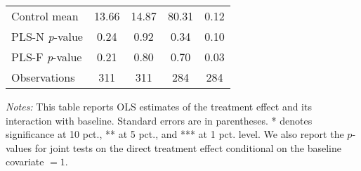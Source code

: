 \begin{table}[ht]
{\begin{threeparttable}
\begin{tabular}{l*{4}{c}}
Control mean    &    13.66         &    14.87         &    80.31         &     0.12         \\
PLS-N \emph{p}-value&     0.24         &     0.92         &     0.34         &     0.10         \\
PLS-F \emph{p}-value&     0.21         &     0.80         &     0.70         &     0.03         \\
Observations    &      311         &      311         &      284         &      284         \\
\bottomrule \end{tabular} \begin{tablenotes}[flushleft] \footnotesize \item \emph{Notes:} This table reports OLS estimates of the treatment effect and its interaction with baseline. Standard errors are in parentheses. * denotes significance at 10 pct., ** at 5 pct., and *** at 1 pct. level. We also report the \(p\)-values for joint tests on the direct treatment effect conditional on the baseline covariate $= 1$. \end{tablenotes} \end{threeparttable} } \end{table}

